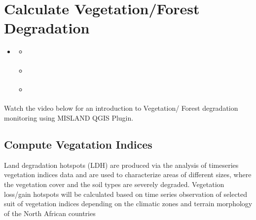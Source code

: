 \documentclass[letterpaper,10pt,english]{sphinxmanual}
\begin{document}
\chapter{Calculate Vegetation/Forest Degradation}
\label{\detokenize{Qgis_Plugin/vegetation_degradation_training:calculate-vegetation-forest-degradation}}\label{\detokenize{Qgis_Plugin/vegetation_degradation_training::doc}}
\begin{sphinxShadowBox}
\begin{itemize}
\item {} 
\sphinxAtStartPar
{}\label{\detokenize{Qgis_Plugin/vegetation_degradation_training:id1}}{\hyperref[\detokenize{Qgis_Plugin/vegetation_degradation_training:calculate-vegetation-forest-degradation}]{}}
\begin{itemize}
\item {} 
\sphinxAtStartPar
{}\label{\detokenize{Qgis_Plugin/vegetation_degradation_training:id2}}{\hyperref[\detokenize{Qgis_Plugin/vegetation_degradation_training:compute-vegatation-indices}]{}}

\item {} 
\sphinxAtStartPar
{}\label{\detokenize{Qgis_Plugin/vegetation_degradation_training:id3}}{\hyperref[\detokenize{Qgis_Plugin/vegetation_degradation_training:compute-forest-fires}]{}}

\item {} 
\sphinxAtStartPar
{}\label{\detokenize{Qgis_Plugin/vegetation_degradation_training:id4}}{\hyperref[\detokenize{Qgis_Plugin/vegetation_degradation_training:compute-forest-change-and-total-carbon-summary}]{}}

\end{itemize}

\end{itemize}
\end{sphinxShadowBox}

\sphinxAtStartPar
Watch the video below for an introduction to Vegetation/ Forest degradation
monitoring using MISLAND QGIS Plugin.




\section{Compute Vegatation Indices}
\label{\detokenize{Qgis_Plugin/vegetation_degradation_training:compute-vegatation-indices}}
\sphinxAtStartPar
Land degradation hotspots (LDH) are produced via the analysis of time\sphinxhyphen{}series
vegetation indices data and are used to characterize areas of different sizes,
where the vegetation cover and the soil types are severely degraded. Vegetation
loss/gain hotspots will be calculated based on time series observation of selected
suit of vegetation indices depending on the climatic zones and terrain morphology
of the North African countries
\end{document}
